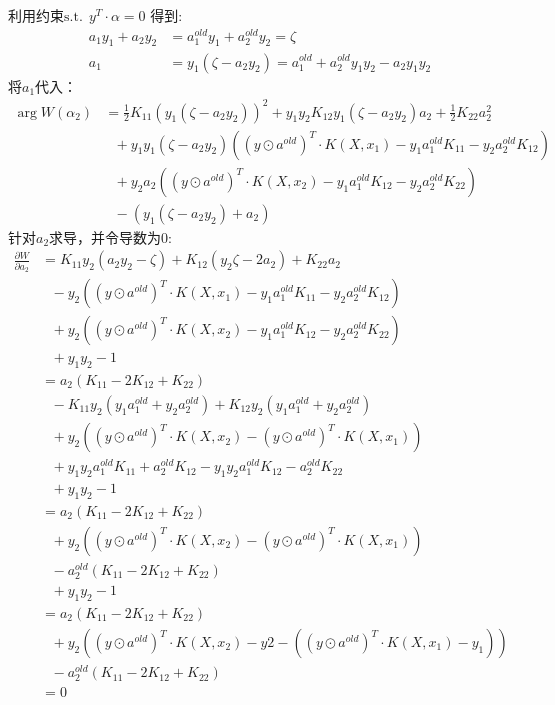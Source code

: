 \documentclass[12pt, a4paper, oneside]{ctexart}
\begin{document}
利用约束$ \mathrm{ s.t. } \ \ y^T \cdot \alpha = 0 $ 得到: 
\begin{align}      
     a_1y_1 + a_2y_2 &= a_1^{old}y_1 + a_2^{old}y_2 = \zeta \nonumber\\
     a_1 &= y_1( \zeta - a_2y_2) =  a_1^{old} + a_2^{old}y_1y_2 - a_2y_1y_2 \nonumber
\end{align}
将$a_1$代入：
\begin{align}      
    \mathop{\arg\min_{\alpha_2}}  W(\alpha_2) &=  \frac{1}{2}K_{11}(y_1( \zeta - a_2y_2))^2 + y_1y_2K_{12}y_1( \zeta - a_2y_2)a_2  + \frac{1}{2}K_{22}a_2^2 \nonumber \\
        & \ \ \ + y_1y_1( \zeta - a_2y_2)((y \odot a^{old})^T \cdot K(X, x_1) - y_1a_1^{old}K_{11} - y_2a_2^{old}K_{12} ) \nonumber \\
        & \ \ \ + y_2a_2((y \odot a^{old})^T \cdot K(X, x_2) - y_1a_1^{old}K_{12} - y_2a_2^{old}K_{22} ) \nonumber \\
        & \ \ \ - (y_1( \zeta - a_2y_2) + a_2) \nonumber 
\end{align}
针对$a_2$求导，并令导数为0:
\begin{align}
    \frac{\partial W}{\partial a_2} &= K_{11}y_2( a_2y_2 - \zeta) + K_{12}(y_2\zeta - 2a_2) + K_{22}a_2 \nonumber \\
    & \ \ \ - y_2((y \odot a^{old})^T \cdot K(X, x_1) - y_1a_1^{old}K_{11} - y_2a_2^{old}K_{12} ) \nonumber \\
    & \ \ \ + y_2((y \odot a^{old})^T \cdot K(X, x_2) - y_1a_1^{old}K_{12} - y_2a_2^{old}K_{22} ) \nonumber \\
    & \ \ \ + y_1y_2 - 1 \nonumber \\
    &= a_2(K_{11} - 2K_{12} + K_{22}) \nonumber \\
    & \ \ \ - K_{11}y_2(y_1a_1^{old} + y_2a_2^{old}) + K_{12}y_2(y_1a_1^{old} + y_2a_2^{old}) \nonumber \\
    & \ \ \ + y_2((y \odot a^{old})^T \cdot K(X, x_2) - (y \odot a^{old})^T \cdot K(X, x_1) ) \nonumber \\
    & \ \ \ + y_1y_2a_1^{old}K_{11} + a_2^{old}K_{12} - y_1y_2a_1^{old}K_{12} - a_2^{old}K_{22} \nonumber \\
    & \ \ \ + y_1y_2 - 1 \nonumber \\
    &= a_2(K_{11} - 2K_{12} + K_{22}) \nonumber \\
    & \ \ \ + y_2((y \odot a^{old})^T \cdot K(X, x_2) - (y \odot a^{old})^T \cdot K(X, x_1) ) \nonumber \\
    & \ \ \ - a_2^{old}(K_{11} - 2K_{12} + K_{22}) \nonumber \\
    & \ \ \ + y_1y_2 - 1 \nonumber \\
    &= a_2(K_{11} - 2K_{12} + K_{22}) \nonumber \\
    & \ \ \ + y_2((y \odot a^{old})^T \cdot K(X, x_2) - y2 - ((y \odot a^{old})^T \cdot K(X, x_1) - y_1)) \nonumber \\
    & \ \ \ - a_2^{old}(K_{11} - 2K_{12} + K_{22}) \nonumber \\
    &= 0 \nonumber
\end{align}
\end{document}

